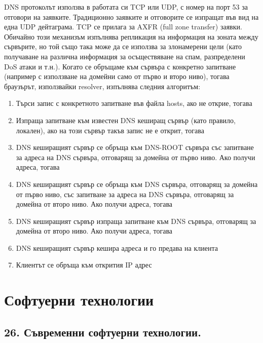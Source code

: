 \documentclass{article}
\begin{document}
DNS протоколът използва в работата си TCP или UDP, с номер на порт 53 за отговори на заявките. Традиционно заявките и отговорите
се изпращат във вид на една UDP дейтаграма. TCP се прилага за AXFR (full zone transfer) заявки. Обичайно този механизъм изпълнява
репликация на информация на зоната между сървърите, но той също така може да се използва за злонамерени цели (като получаване на
различна информация за осъществяване на спам, разпределени DoS атаки и т.н.). Когато се обръщаме към сървъра с конкретно
запитване (например с използване на домейни само от първо и второ ниво), тогава браузърът, използвайки resolver, изпълнява
следния алгоритъм:
\begin{enumerate}
    \item Търси запис с конкретното запитване във файла hosts, ако не открие, тогава
    \item  Изпраща запитване към известен DNS кеширащ сървър (като правило, локален), ако на този сървър такъв запис не е
    открит, тогава
    \item DNS кеширащият сървър се обръща към DNS-ROOT сървъра със запитване за адреса на DNS сървъра, отговарящ за домейна от
    първо ниво. Ако получи адреса, тогава
    \item DNS кеширащият сървър се обръща към DNS сървъра, отговарящ за домейна от първо ниво, със запитване за адреса на DNS
    сървъра, отговарящ за домейна от второ ниво. Ако получи адреса, тогава
    \item DNS кеширащият сървър изпраща запитване към DNS сървъра, отговарящ за домейна от второ ниво. Ако получи адреса, тогава
    \item DNS кеширащият сървър кешира адреса и го предава на клиента
    \item Клиентът се обръща към открития IP адрес
\end{enumerate}

\section*{\centering \color{bordeaux}Софтуерни технологии}

\subsection*{\color{bordeaux}26. Съвременни софтуерни технологии.}
\end{document}
